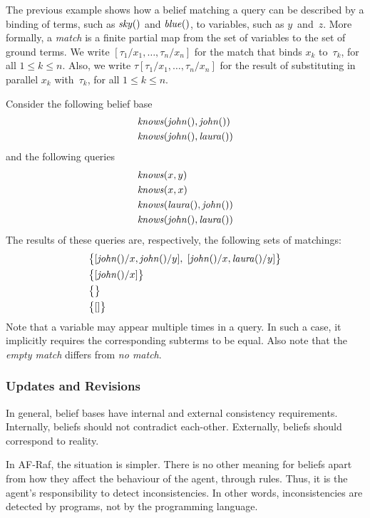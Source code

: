 \documentclass[a4paper,12pt,oneside,fleqn]{book} %
\newcommand{\todo}[1]{[\textcolor{red}{TODO}: #1]}
\begin{document}
The previous example shows how a belief matching a query can be described
by a binding of terms, such as ${\it sky}()$ and ${\it blue}()$, to
variables, such as $y$~and~$z$.  More formally, a \emph{match} is a finite
partial map from the set of variables to the set of ground terms.  We write
$[\tau_1/x_1,\ldots,\tau_n/x_n]$ for the match that binds $x_k$
to~$\tau_k$, for all $1\le k\le n$.  Also, we write
$\tau[\tau_1/x_1,\ldots,\tau_n/x_n]$ for the result of substituting in
parallel $x_k$ with~$\tau_k$, for all $1\le k\le n$.

\begin{example} Consider the following belief base \begin{align} &{\it
knows}({\it john}(), {\it john}()) \\ &{\it knows}({\it john}(), {\it
laura}()) \end{align} and the following queries \begin{align} &{\it
knows}(x, y) \\ &{\it knows}(x, x) \\ &{\it knows}({\it laura}(), {\it
john}()) \\ &{\it knows}({\it john}(), {\it laura}()) \end{align} The
results of these queries are, respectively, the following sets of
matchings: \begin{align} &\bigl\{ [{\it john}()/x, {\it john}()/y],\; [{\it
john}()/x,{\it laura}()/y] \bigr\} \\ &\bigl\{ [{\it john}()/x] \bigr\} \\
&\bigl\{\bigr\} \\ &\bigl\{[]\bigr\} \end{align} Note that a variable may
appear multiple times in a query.  In such a case, it implicitly requires
the corresponding subterms to be equal.  Also note that the \emph{empty
match} differs from \emph{no match}.
\end{example}


\subsubsection{Updates and Revisions}

In general, belief bases have internal and external consistency
requirements.  Internally, beliefs should not contradict each-other.
Externally, beliefs should correspond to reality.

In AF-Raf, the situation is simpler.  There is no other meaning for beliefs
apart from how they affect the behaviour of the agent, through rules.
Thus, it is the agent's responsibility to detect inconsistencies.  In other
words, inconsistencies are detected by programs, not by the programming
language.
\end{document}
